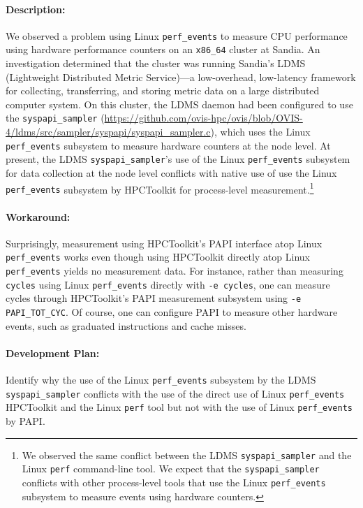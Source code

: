 \documentclass[11pt,twoside,letterpaper]{report}
\begin{document}
\paragraph{Description:} We observed a problem using Linux  {\tt perf\_events} to measure CPU performance using hardware performance counters on an {\tt x86\_64} cluster at Sandia. An investigation determined that the cluster was running Sandia's LDMS (Lightweight Distributed Metric Service)---a low-overhead, low-latency framework for collecting, transferring, and storing metric data on a large distributed computer system. On this cluster, the LDMS  daemon had been configured to use the {\tt syspapi\_sampler} (\url{https://github.com/ovis-hpc/ovis/blob/OVIS-4/ldms/src/sampler/syspapi/syspapi\_sampler.c}), which uses the Linux {\tt perf\_events} subsystem to measure hardware counters at the node level. At present, the LDMS {\tt syspapi\_sampler}'s use of  the Linux {\tt perf\_events} subsystem for data collection at the node level conflicts with native use of use the Linux {\tt perf\_events} subsystem by HPCToolkit for process-level measurement.\footnote{We observed the same conflict between the LDMS {\tt syspapi\_sampler}  and the Linux {\tt perf} command-line tool. We expect that the  {\tt syspapi\_sampler}
conflicts with other process-level tools that use the Linux {\tt perf\_events} subsystem to measure events using hardware counters.}

\paragraph{Workaround:} Surprisingly, measurement using HPCToolkit's PAPI interface atop Linux  {\tt perf\_events} works even though using HPCToolkit directly atop Linux  {\tt perf\_events} yields no measurement data.  For instance, rather than measuring {\tt cycles} using Linux {\tt perf\_events} directly with {\tt -e cycles}, one can measure cycles through HPCToolkit's PAPI measurement subsystem using {\tt -e PAPI\_TOT\_CYC}. Of course, one can configure PAPI to measure other hardware events, such as graduated instructions and cache misses.

\paragraph{Development Plan:} Identify why the use of the Linux {\tt perf\_events} subsystem by the LDMS {\tt syspapi\_sampler} conflicts with the use of the direct use of Linux {\tt perf\_events} HPCToolkit and the Linux {\tt perf} tool but not with the use of Linux {\tt perf\_events} by PAPI.
\end{document}
